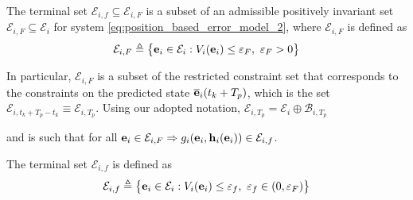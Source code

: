 The terminal set
$\mathcal{E}_{i,f} \subseteq \mathcal{E}_{i,F}$ is a
subset of an admissible positively invariant set
$\mathcal{E}_{i,F} \subseteq \mathcal{E}_i$ for system
\eqref{eq:position_based_error_model_2}, where $\mathcal{E}_{i,F}$ is defined as
\begin{align}
  \mathcal{E}_{i,F} \triangleq \big\{\bm{\mathbf{e}}_i \in \mathcal{E}_i : V_i(\bm{\mathbf{e}}_i) \leq \varepsilon_F,\ \varepsilon_F > 0 \big\}
\end{align}

In particular, $\mathcal{E}_{i,F}$ is a subset of the restricted constraint
set that corresponds to the constraints on the predicted state
$\overline{\bm{\mathbf{e}}}_i(t_k + T_p)$, which is the set
$\mathcal{E}_{i,t_k + T_p - t_k} \equiv \mathcal{E}_{i,T_p}$. Using our
adopted notation, $\mathcal{E}_{i,T_p} = \mathcal{E}_i \oplus \mathcal{B}_{i, T_p}$

and is such that for all
$\bm{\mathbf{e}}_i \in \mathcal{E}_{i,F} \Rightarrow g_i(\bm{\mathbf{e}}_i, \bm{\mathbf{h}}_i(\bm{\mathbf{e}}_i)) \in \mathcal{E}_{i,f}$.


The terminal set $\mathcal{E}_{i,f}$ is defined as
\begin{align}
  \mathcal{E}_{i,f} \triangleq \big\{\bm{\mathbf{e}}_i \in \mathcal{E}_i : V_i(\bm{\mathbf{e}}_i) \leq \varepsilon_f,\ \varepsilon_f \in (0, \varepsilon_F) \big\}
\end{align}

\begin{figure}[ht!]
  \centering
  
\end{figure}

\begin{figure}[ht!]
  \centering
  
\end{figure}


